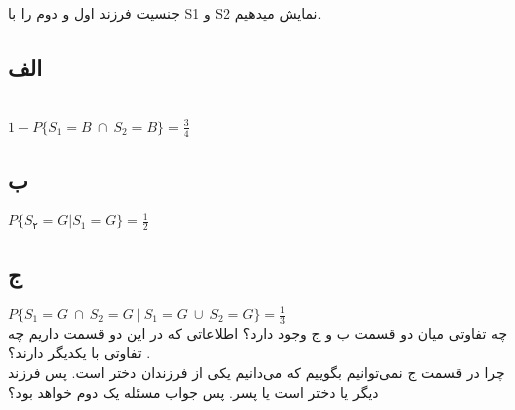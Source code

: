 جنسیت فرزند اول و دوم را با S1 و S2 نمایش میدهیم.
\subsection*{الف}
\\
\(1 - P\{S_{1} = B\ \cap\  S_{2} = B\} =  \frac{3}{4}\)
\subsection*{ب}
\(P\{S_{۲} = G  |  S_{1} = G\} = \frac{1}{2}\)
\subsection*{ج}
\(P\{{S_{1} = G}\ \cap \ {S_{2} = G}\ |\ S_{1} = G \ \cup \ S_{2} = G\} =
\frac{1}{3}\)\\
چه تفاوتی میان دو قسمت ب و ج وجود دارد؟  اطلاعاتی که در این دو قسمت داریم چه تفاوتی با یکدیگر دارند؟ .
\\
چرا در قسمت ج نمی‌توانیم بگوییم که می‌دانیم یکی از فرزندان دختر است. پس فرزند دیگر یا دختر است یا پسر. پس جواب مسئله یک دوم خواهد بود؟